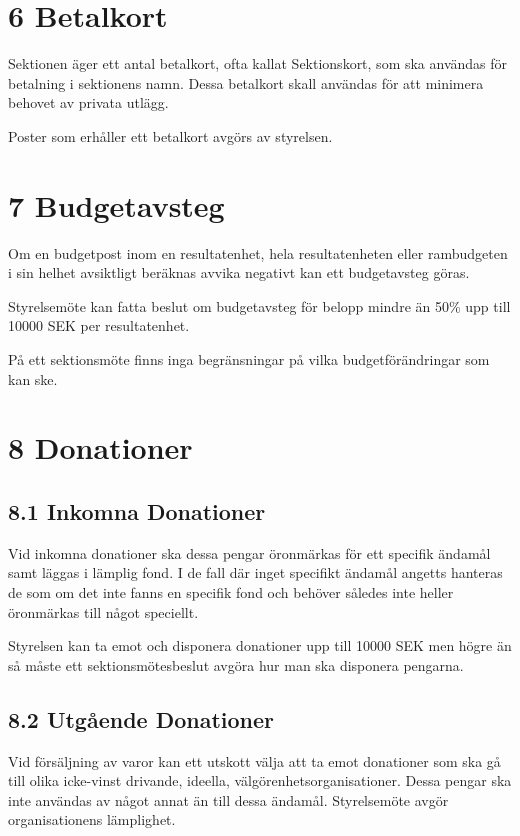 \documentclass[]{dsekkallelse}
\begin{document}
\section{6 Betalkort}
Sektionen äger ett antal betalkort, ofta kallat Sektionskort, som ska användas för betalning i sektionens namn. Dessa betalkort skall användas för att minimera behovet av privata utlägg.

Poster som erhåller ett betalkort avgörs av styrelsen.

\section{7 Budgetavsteg}
Om en budgetpost inom en resultatenhet, hela resultatenheten eller rambudgeten i sin helhet avsiktligt beräknas avvika negativt kan ett budgetavsteg göras.

Styrelsemöte kan fatta beslut om budgetavsteg för belopp mindre än 50\% upp till 10000 SEK per resultatenhet.

På ett sektionsmöte finns inga begränsningar på vilka budgetförändringar som kan ske.

\section{8 Donationer}
\subsection{8.1 Inkomna Donationer}
Vid inkomna donationer ska dessa pengar öronmärkas för ett specifik ändamål samt läggas i lämplig fond. I de fall där inget specifikt ändamål angetts hanteras de som om det inte fanns en specifik fond och behöver således inte heller öronmärkas till något speciellt.

Styrelsen kan ta emot och disponera donationer upp till 10000 SEK men högre än så måste ett sektionsmötesbeslut avgöra hur man ska disponera pengarna.

\subsection{8.2 Utgående Donationer}
Vid försäljning av varor kan ett utskott välja att ta emot donationer som ska gå till olika icke-vinst drivande, ideella, välgörenhetsorganisationer. Dessa pengar ska inte användas av något annat än till dessa ändamål. Styrelsemöte avgör organisationens lämplighet.
\end{document}
